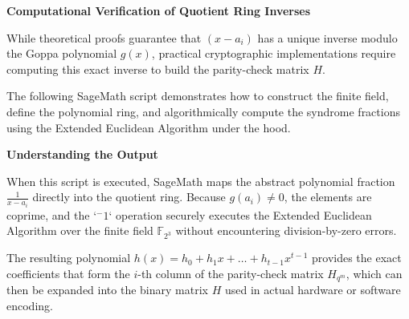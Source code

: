 \documentclass[11pt]{article}
\begin{document}
	\begin{mdframed}[backgroundcolor=white, linecolor=black, linewidth=1.5pt, roundcorner=5pt]
		
		\textbf{Computational Verification of Quotient Ring Inverses}
		
		While theoretical proofs guarantee that $(x - a_i)$ has a unique inverse modulo the Goppa polynomial $g(x)$, practical cryptographic implementations require computing this exact inverse to build the parity-check matrix $H$. 
		
		The following SageMath script demonstrates how to construct the finite field, define the polynomial ring, and algorithmically compute the syndrome fractions using the Extended Euclidean Algorithm under the hood.
		
		\vspace{0.5cm}
		
%
%
%
%
%
%
%
		
		\vspace{0.5cm}
		\textbf{Understanding the Output}
		
		When this script is executed, SageMath maps the abstract polynomial fraction $\frac{1}{x - a_i}$ directly into the quotient ring. Because $g(a_i) \neq 0$, the elements are coprime, and the `$^-1$` operation securely executes the Extended Euclidean Algorithm over the finite field $\mathbb{F}_{2^3}$ without encountering division-by-zero errors. 
		
		The resulting polynomial $h(x) = h_0 + h_1 x + \dots + h_{t-1} x^{t-1}$ provides the exact coefficients that form the $i$-th column of the parity-check matrix $H_{q^m}$, which can then be expanded into the binary matrix $H$ used in actual hardware or software encoding.
	\end{mdframed}
	
\end{document}
